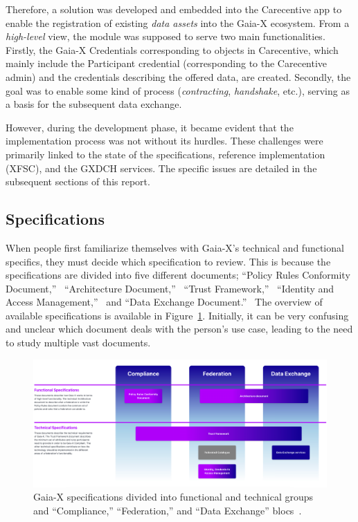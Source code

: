 Therefore, a solution was developed and embedded into the Carecentive app to enable the registration of existing \textit{data assets} into the Gaia-X ecosystem.
From a \textit{high-level} view, the module was supposed to serve two main functionalities.
Firstly, the Gaia-X Credentials corresponding to objects in Carecentive, which mainly include the Participant credential (corresponding to the Carecentive admin) and the credentials describing the offered data, are created.
Secondly, the goal was to enable some kind of process (\textit{contracting}, \textit{handshake}, etc.), serving as a basis for the subsequent data exchange.

However, during the development phase, it became evident that the implementation process was not without its hurdles.
These challenges were primarily linked to the state of the specifications, reference implementation (XFSC), and the GXDCH services.
The specific issues are detailed in the subsequent sections of this report.

\subsection{Specifications}\label{subsec:specifications}

When people first familiarize themselves with Gaia-X's technical and functional specifics, they must decide which specification to review.
This is because the specifications are divided into five different documents; ``Policy Rules Conformity Document,''~\cite{gaiax_policy_rules} ``Architecture Document,''~\cite{gaiax_architecture_document} ``Trust Framework,''~\cite{gaiax_trust_framework} ``Identity and Access Management,''~\cite{gaiax_identity_and_access_management} and ``Data Exchange Document.''~\cite{gaiax_data_exchange_document}
The overview of available specifications is available in Figure~\ref{fig:specifications}.
Initially, it can be very confusing and unclear which document deals with the person's use case, leading to the need to study multiple vast documents.

\begin{figure}
    \centering
    \includegraphics[width=\textwidth]{figures/specifications.png}
    \caption{Gaia-X specifications divided into functional and technical groups and ``Compliance,'' ``Federation,'' and ``Data Exchange'' blocs~\cite{gaiax}.}\label{fig:specifications}
\end{figure}

